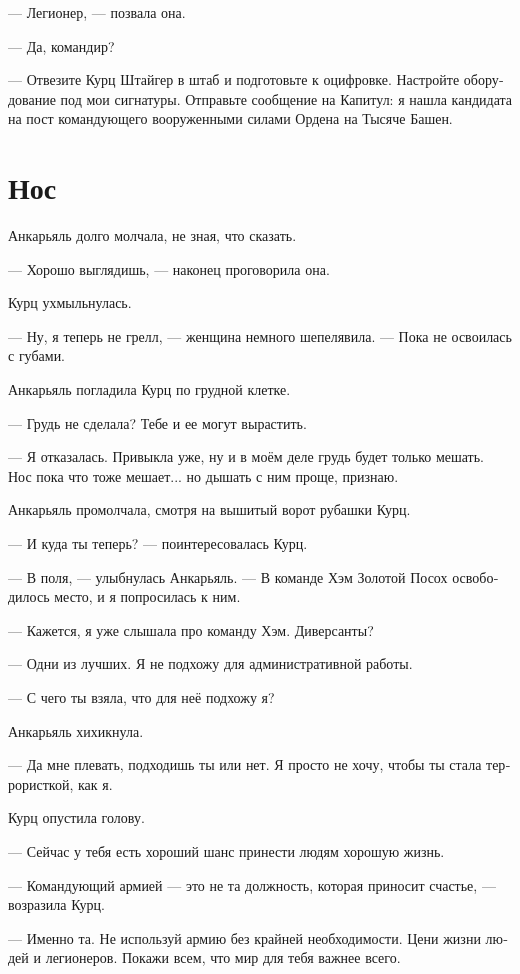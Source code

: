 \documentclass[a4paper,10pt,fleqn]{book}\usepackage{polyglossia}\setdefaultlanguage[babelshorthands=true]{russian}\setotherlanguage{english}\defaultfontfeatures{Ligatures=TeX,Mapping=tex-text}\usepackage{xcolor}\newcommand{\ml}[3]{#2}
\begin{document}
--- Легионер, --- позвала она.

--- Да, командир?

--- Отвезите Курц Штайгер в штаб и подготовьте к оцифровке.
Настройте оборудование под мои сигнатуры.
Отправьте сообщение на Капитул: я нашла кандидата на пост командующего вооруженными силами Ордена на Тысяче Башен.

\section{Нос}

Анкарьяль долго молчала, не зная, что сказать.

--- Хорошо выглядишь, --- наконец проговорила она.

Курц ухмыльнулась.

--- Ну, я теперь не грелл, --- женщина немного шепелявила.
--- Пока не освоилась с губами.

Анкарьяль погладила Курц по грудной клетке.

--- Грудь не сделала?
Тебе и ее могут вырастить.

--- Я отказалась.
Привыкла уже, ну и в моём деле грудь будет только мешать.
Нос пока что тоже мешает... но дышать с ним проще, признаю.

Анкарьяль промолчала, смотря на вышитый ворот рубашки Курц.

--- И куда ты теперь? --- поинтересовалась Курц.

--- В поля, --- улыбнулась Анкарьяль.
--- В команде Хэм Золотой Посох освободилось место, и я попросилась к ним.

--- Кажется, я уже слышала про команду Хэм.
Диверсанты?

--- Одни из лучших.
Я не подхожу для административной работы.

--- С чего ты взяла, что для неё подхожу я?

Анкарьяль хихикнула.

--- Да мне плевать, подходишь ты или нет.
Я просто не хочу, чтобы ты стала террористкой, как я.

Курц опустила голову.

--- Сейчас у тебя есть хороший шанс принести людям хорошую жизнь.

--- Командующий армией --- это не та должность, которая приносит счастье, --- возразила Курц.

--- Именно та.
Не используй армию без крайней необходимости.
Цени жизни людей и легионеров.
Покажи всем, что мир для тебя важнее всего.
\end{document}
